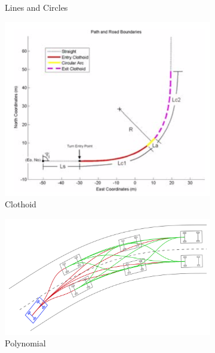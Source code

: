 \begin{figure}[h!]
\begin{subfigure}[b]{0.22\linewidth}
     \caption{Lines and Circles \cite{gonzalez2016review}}
  \end{subfigure}
  \hfill
  \begin{subfigure}[b]{0.33\linewidth}
    \includegraphics[width=\linewidth]{images/c_clothoid.png}
     \caption{Clothoid \cite{gonzalez2016review}}
  \end{subfigure}
  \hfill
  \begin{subfigure}[b]{0.38\linewidth}
    \includegraphics[width=\linewidth]{images/c_polynomial.png}
    \caption{Polynomial \cite{gonzalez2016review}}
  \end{subfigure}
  \newline
  \begin{subfigure}[b]{0.28\linewidth}

\end{subfigure}
\end{figure}
